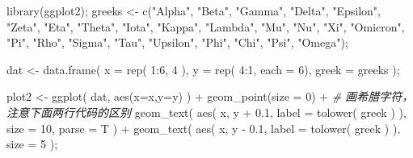 \documentclass[
]{article}
\newenvironment{Shaded}{}{}
\newcommand{\AttributeTok}[1]{\textcolor[rgb]{0.49,0.56,0.16}{#1}}
\newcommand{\CommentTok}[1]{\textcolor[rgb]{0.38,0.63,0.69}{\textit{#1}}}
\newcommand{\DecValTok}[1]{\textcolor[rgb]{0.25,0.63,0.44}{#1}}
\newcommand{\FloatTok}[1]{\textcolor[rgb]{0.25,0.63,0.44}{#1}}
\newcommand{\FunctionTok}[1]{\textcolor[rgb]{0.02,0.16,0.49}{#1}}
\newcommand{\NormalTok}[1]{#1}
\newcommand{\OtherTok}[1]{\textcolor[rgb]{0.00,0.44,0.13}{#1}}
\newcommand{\SpecialCharTok}[1]{\textcolor[rgb]{0.25,0.44,0.63}{#1}}
\newcommand{\StringTok}[1]{\textcolor[rgb]{0.25,0.44,0.63}{#1}}
\begin{document}
\begin{Shaded}
\begin{Highlighting}[]
\FunctionTok{library}\NormalTok{(ggplot2);}
\NormalTok{greeks }\OtherTok{\textless{}{-}} \FunctionTok{c}\NormalTok{(}\StringTok{"Alpha"}\NormalTok{, }\StringTok{"Beta"}\NormalTok{, }\StringTok{"Gamma"}\NormalTok{, }\StringTok{"Delta"}\NormalTok{, }\StringTok{"Epsilon"}\NormalTok{, }\StringTok{"Zeta"}\NormalTok{,}
            \StringTok{"Eta"}\NormalTok{, }\StringTok{"Theta"}\NormalTok{, }\StringTok{"Iota"}\NormalTok{, }\StringTok{"Kappa"}\NormalTok{, }\StringTok{"Lambda"}\NormalTok{, }\StringTok{"Mu"}\NormalTok{,}
            \StringTok{"Nu"}\NormalTok{, }\StringTok{"Xi"}\NormalTok{, }\StringTok{"Omicron"}\NormalTok{, }\StringTok{"Pi"}\NormalTok{, }\StringTok{"Rho"}\NormalTok{, }\StringTok{"Sigma"}\NormalTok{,}
            \StringTok{"Tau"}\NormalTok{, }\StringTok{"Upsilon"}\NormalTok{, }\StringTok{"Phi"}\NormalTok{, }\StringTok{"Chi"}\NormalTok{, }\StringTok{"Psi"}\NormalTok{, }\StringTok{"Omega"}\NormalTok{);}

\NormalTok{dat }\OtherTok{\textless{}{-}} \FunctionTok{data.frame}\NormalTok{( }\AttributeTok{x =} \FunctionTok{rep}\NormalTok{( }\DecValTok{1}\SpecialCharTok{:}\DecValTok{6}\NormalTok{, }\DecValTok{4}\NormalTok{ ), }\AttributeTok{y =} \FunctionTok{rep}\NormalTok{( }\DecValTok{4}\SpecialCharTok{:}\DecValTok{1}\NormalTok{, }\AttributeTok{each =} \DecValTok{6}\NormalTok{), }\AttributeTok{greek =}\NormalTok{ greeks );}

\NormalTok{plot2 }\OtherTok{\textless{}{-}} 
  \FunctionTok{ggplot}\NormalTok{( dat, }\FunctionTok{aes}\NormalTok{(}\AttributeTok{x=}\NormalTok{x,}\AttributeTok{y=}\NormalTok{y) ) }\SpecialCharTok{+} \FunctionTok{geom\_point}\NormalTok{(}\AttributeTok{size =} \DecValTok{0}\NormalTok{) }\SpecialCharTok{+}
    \CommentTok{\# 画希腊字符，注意下面两行代码的区别}
    \FunctionTok{geom\_text}\NormalTok{( }\FunctionTok{aes}\NormalTok{( x, y }\SpecialCharTok{+} \FloatTok{0.1}\NormalTok{, }\AttributeTok{label =} \FunctionTok{tolower}\NormalTok{( greek ) ), }\AttributeTok{size =} \DecValTok{10}\NormalTok{, }\AttributeTok{parse =}\NormalTok{ T ) }\SpecialCharTok{+}
    \FunctionTok{geom\_text}\NormalTok{( }\FunctionTok{aes}\NormalTok{( x, y }\SpecialCharTok{{-}} \FloatTok{0.1}\NormalTok{, }\AttributeTok{label =} \FunctionTok{tolower}\NormalTok{( greek ) ), }\AttributeTok{size =} \DecValTok{5}\NormalTok{  );}
\end{Highlighting}
\end{Shaded}
\end{document}
